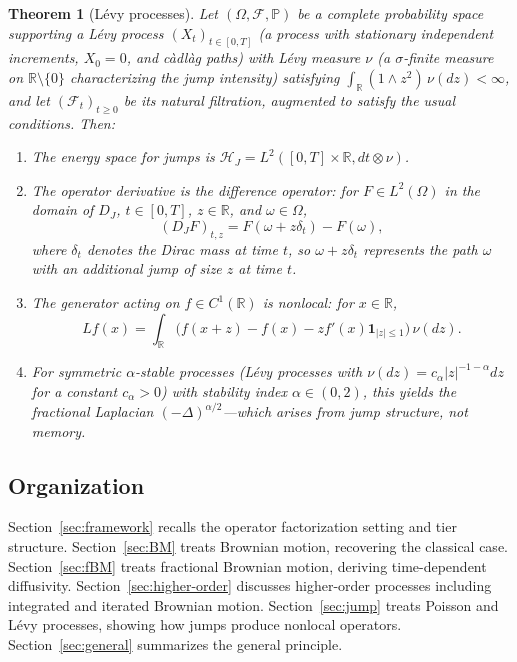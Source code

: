 \documentclass[12pt]{article}
\theoremstyle{plain}
\newtheorem{theorem}{Theorem}[section]
\theoremstyle{definition}
\theoremstyle{remark}
\newcommand{\R}{\mathbb{R}}
\newcommand{\F}{\mathcal{F}}
\newcommand{\PP}{\mathbb{P}}
\newcommand{\HH}{\mathcal{H}}
\begin{document}
\begin{theorem}[L\'{e}vy processes]\label{thm:Levy}
Let $(\Omega, \F, \PP)$ be a complete probability space supporting a L\'{e}vy process $(X_t)_{t \in [0,T]}$ (a process with stationary independent increments, $X_0 = 0$, and càdlàg paths) with L\'{e}vy measure $\nu$ (a $\sigma$-finite measure on $\R \setminus \{0\}$ characterizing the jump intensity) satisfying $\int_{\R}(1 \wedge z^2)\,\nu(dz) < \infty$, and let $(\F_t)_{t \geq 0}$ be its natural filtration, augmented to satisfy the usual conditions. Then:
\begin{enumerate}[label=(\alph*)]
\item The energy space for jumps is $\HH_J = L^2([0,T] \times \R, dt \otimes \nu)$.
\item The operator derivative is the difference operator: for $F \in L^2(\Omega)$ in the domain of $D_J$, $t \in [0,T]$, $z \in \R$, and $\omega \in \Omega$,
\begin{equation*}
(D_J F)_{t,z} = F(\omega + z\delta_t) - F(\omega),
\end{equation*}
where $\delta_t$ denotes the Dirac mass at time $t$, so $\omega + z\delta_t$ represents the path $\omega$ with an additional jump of size $z$ at time $t$.
\item The generator acting on $f \in C^1(\R)$ is nonlocal: for $x \in \R$,
\begin{equation}\label{eq:Levy-generator}
Lf(x) = \int_{\R} \bigl(f(x+z) - f(x) - zf'(x)\mathbf{1}_{|z| \leq 1}\bigr)\,\nu(dz).
\end{equation}
\item For symmetric $\alpha$-stable processes (Lévy processes with $\nu(dz) = c_\alpha |z|^{-1-\alpha} dz$ for a constant $c_\alpha > 0$) with stability index $\alpha \in (0,2)$, this yields the fractional Laplacian $(-\Delta)^{\alpha/2}$---which arises from jump structure, not memory.
\end{enumerate}
\end{theorem}

\subsection{Organization}

Section~\ref{sec:framework} recalls the operator factorization setting and tier structure. Section~\ref{sec:BM} treats Brownian motion, recovering the classical case. Section~\ref{sec:fBM} treats fractional Brownian motion, deriving time-dependent diffusivity. Section~\ref{sec:higher-order} discusses higher-order processes including integrated and iterated Brownian motion. Section~\ref{sec:jump} treats Poisson and L\'{e}vy processes, showing how jumps produce nonlocal operators. Section~\ref{sec:general} summarizes the general principle.
\end{document}
